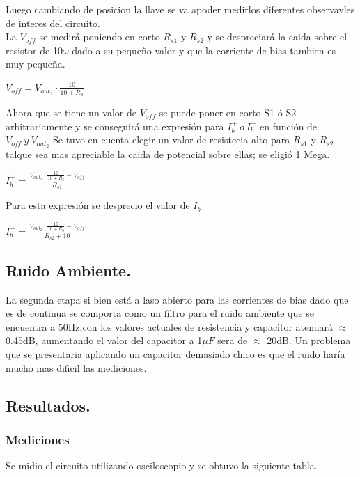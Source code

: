 \documentclass[a4paper]{article}
\begin{document}
Luego cambiando de posicion la llave se va apoder medirlos diferentes observavles de interes del circuito.\\
La $V_{off}$ se medirá poniendo en corto $R_{s1}$ y $R_{s2}$ y se despreciará la caida sobre el resistor de 10$\omega$ dado a su pequeño valor y que la corriente de bias tambien es muy pequeña.\\
\begin{center}$V_{off}=V_{out_2} \cdot \frac{10}{10+R_3} $\end{center}
Ahora que se tiene un valor de $V_{off}$ se  puede poner en corto S1 ó S2 arbitrariamente y se conseguirá una expresión para $ I_b^+ \ o \  I_b^-$ en función de $V_{off} \ y \ V_{out_2}$
Se tuvo en cuenta elegir un valor de resistecia alto para $R_{s1}$ y $R_{s2}$ talque sea mas apreciable la caida de potencial sobre ellas; se eligió 1 Mega.\\
\begin{center}$I_b^+=\frac{V_{out_2} \cdot \frac{10}{10+R_3}-V_{off}}{R_{s1}}$\end{center}
Para esta expresión se desprecio el valor de $I_b^-$
\begin{center}$I_b^-=\frac{V_{out_2} \cdot \frac{10}{10+R_3}-V_{off}}{R_{s2}+10}$\end{center}

\subsection{Ruido Ambiente.}
La segunda etapa si bien está a laso abierto para las corrientes de bias dado que es de continua se comporta como un filtro para el ruido ambiente que se encuentra a 50Hz,con los valores actuales de resistencia y capacitor atenuará $\approx$ 0.45dB, aumentando el valor del capacitor a 1$\mu F$ sera de  $\approx$ 20dB.
Un problema que se presentaria aplicando un capacitor demasiado chico es que el ruido haría mucho mas dificil las mediciones.
\subsection{Resultados.}
\subsubsection{Mediciones}
Se midio el circuito utilizando osciloscopio y se  obtuvo la siguiente tabla.
\end{document}
